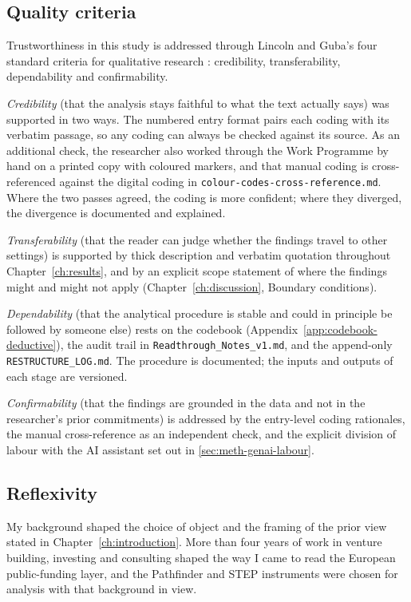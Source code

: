 \subsection{Quality criteria}
\label{sec:meth-quality-criteria}

Trustworthiness in this study is addressed through Lincoln and Guba's
four standard criteria for qualitative research \parencite{lincoln1985naturalistic}:
credibility, transferability, dependability and confirmability.

\emph{Credibility} (that the analysis stays faithful to what the
text actually says) was supported in two ways. The numbered entry
format pairs each coding with its verbatim passage, so any coding can
always be checked against its source. As an additional check, the
researcher also worked through the Work Programme by hand on a
printed copy with coloured markers, and that manual coding is
cross-referenced against the digital coding in
\texttt{colour-codes-cross-reference.md}. Where the two passes agreed,
the coding is more confident; where they diverged, the divergence is
documented and explained.

\emph{Transferability} (that the reader can judge whether the
findings travel to other settings) is supported by thick
description and verbatim quotation throughout Chapter~\ref{ch:results},
and by an explicit scope statement of where the findings might and
might not apply (Chapter~\ref{ch:discussion}, Boundary conditions).

\emph{Dependability} (that the analytical procedure is stable and
could in principle be followed by someone else) rests on the
codebook (Appendix~\ref{app:codebook-deductive}), the audit trail in
\texttt{Readthrough\_Notes\_v1.md}, and the append-only
\texttt{RESTRUCTURE\_LOG.md}. The procedure is documented; the inputs
and outputs of each stage are versioned.

\emph{Confirmability} (that the findings are grounded in the data
and not in the researcher's prior commitments) is addressed by the
entry-level coding rationales, the manual cross-reference as an
independent check, and the explicit division of labour with the AI
assistant set out in \cref{sec:meth-genai-labour}.

\subsection{Reflexivity}
\label{sec:meth-reflexivity}

My background shaped the choice of object and the framing of the
prior view stated in Chapter~\ref{ch:introduction}. More than four
years of work in venture building, investing and consulting shaped
the way I came to read the European public-funding layer, and the
Pathfinder and STEP instruments were chosen for analysis with that
background in view.

